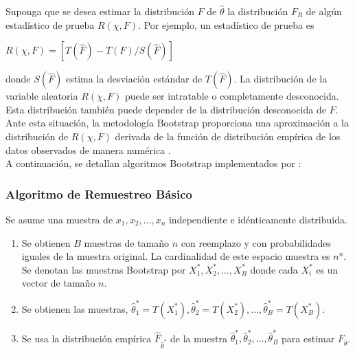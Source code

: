 Suponga que se desea estimar la distribución $F$ de $\hat{\theta}$ la distribución $F_{R}$ de algún estadístico de prueba $R( \chi, F)$. Por ejemplo, un estadístico de prueba es\\

\begin{center}
	$ R( \chi, F) = [T(\hat{F}) - T(F)/S(\hat{F})]$\\
\end{center}

donde $S(\hat{F})$ estima la desviación estándar de $T(\hat{F})$. La distribución de la variable aleatoria $R( \chi, F)$ puede ser intratable o completamente desconocida. Esta distribución también puede depender de la distribución desconocida de $F$. Ante esta situación, la metodología Bootstrap proporciona una aproximación a la distribución de $R( \chi, F)$ derivada de la función de distribución empírica de los datos observados de manera numérica \parencite{balam-2012}.\\

A continuación, se detallan algoritmos Bootstrap implementados por \textcite{balam-2012}:\\

\subsubsection{Algoritmo de Remuestreo Básico \parencite{balam-2012}}

Se asume una muestra de $ x_{1}, x_{2},  \dots,  x_{n}$ independiente e idénticamente distribuida.

\begin{enumerate}
	\item Se obtienen $B$ muestras de tamaño $n$ con reemplazo y con probabilidades iguales de la muestra original. La cardinalidad de este espacio muestra es $n^{n}$. Se denotan las muestras Bootstrap por $X^{*}_{1}, X^{*}_{2},  \dots, X^{*}_{B}$ donde cada $X^{*}_{i}$ es un vector de tamaño $n$.
	
	\item Se obtienen las muestras, $\hat{\theta}^{*}_{1} = T (X^{*}_{1}) , \hat{\theta}^{*}_{2} = T (X^{*}_{2}), \dots,\hat{\theta}^{*}_{B} = T (X^{*}_{B})$.
	
	\item Se usa la distribución empírica $\hat{F}_{\hat{\theta}^{*}}$ de la muestra $\hat{\theta}^{*}_{1},\hat{\theta}^{*}_{2},  \dots, \hat{\theta}^{*}_{B}$ para estimar $F_{\hat{\theta}} $.
\end{enumerate}

